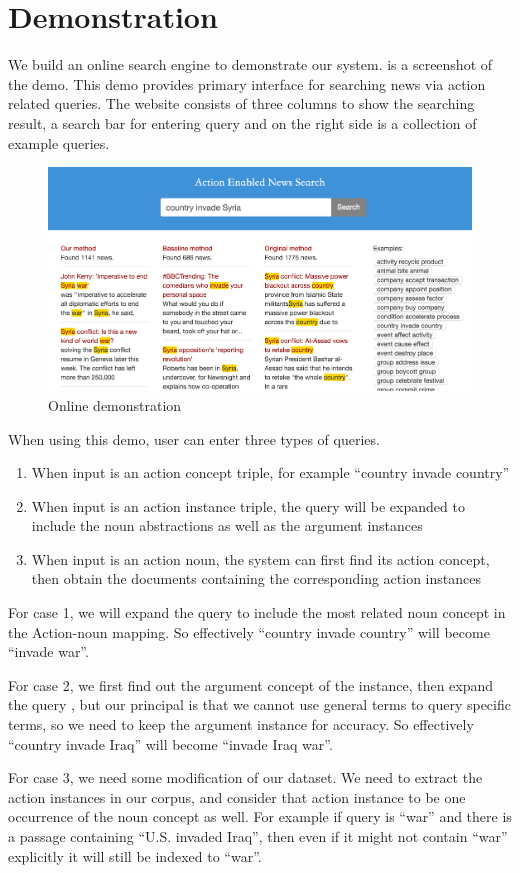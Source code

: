 \section{Demonstration}
We build an online search engine to demonstrate our system.
 is a screenshot of the demo. This demo provides 
primary interface for searching news via action related queries.
The website consists of three columns to show the searching 
result, a search bar for entering query and on the right side is 
a collection of example queries. 

\begin{figure}[th]
\includegraphics[width=2\columnwidth]{img/search.png}
\centering
\caption{Online demonstration}
\label{fig:demosite}
\end{figure}


When using this demo, user can enter three types of queries. 
\begin{enumerate}
\item When input is an action concept triple, for example ``country invade country''
\item When input is an action instance triple, the query will be expanded to include the noun abstractions as well as the argument instances
\item When input is an action noun, the system can first find its action concept, then obtain the documents containing the corresponding action instances
\end{enumerate}
For case 1, we will expand the query to include the most related noun concept in the 
Action-noun mapping. So effectively ``country invade country'' will become ``invade war''.

For case 2, we first find out the argument concept of the instance,
then expand the query , but our principal is that we cannot use
general terms to query specific terms, so we need to keep the
argument instance for accuracy. So effectively ``country invade
Iraq'' will become ``invade Iraq war''.

For case 3, we need some modification of our dataset. We need to extract the action 
instances in our corpus, and consider that action instance to be one occurrence of the
noun concept as well. For example if query is ``war'' and there is a passage containing
``U.S. invaded Iraq'', then even if it might not contain ``war'' explicitly it will still be 
indexed to ``war''.


